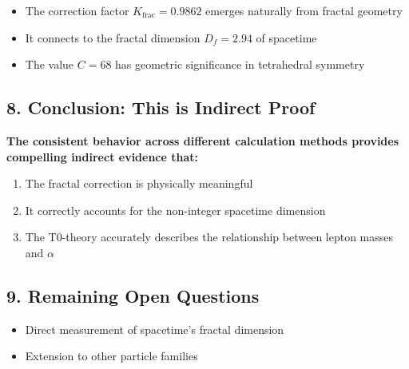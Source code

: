 \documentclass[12pt,a4paper]{article}
\begin{document}
	\begin{itemize}
		\item The correction factor $K_{\text{frac}} = 0.9862$ emerges naturally from fractal geometry
		\item It connects to the fractal dimension $D_f = 2.94$ of spacetime
		\item The value $C = 68$ has geometric significance in tetrahedral symmetry
	\end{itemize}
	
	\subsection*{8. Conclusion: This is Indirect Proof}
	
	\begin{tcolorbox}[colback=red!5!white,colframe=red!75!black]
		\textbf{The consistent behavior across different calculation methods provides compelling indirect evidence that:}
		\begin{enumerate}
			\item The fractal correction is physically meaningful
			\item It correctly accounts for the non-integer spacetime dimension
			\item The T0-theory accurately describes the relationship between lepton masses and $\alpha$
		\end{enumerate}
	\end{tcolorbox}
	
	\subsection*{9. Remaining Open Questions}
	
	\begin{itemize}
		\item Direct measurement of spacetime's fractal dimension

		\item Extension to other particle families
	\end{itemize}
	
\end{document}
